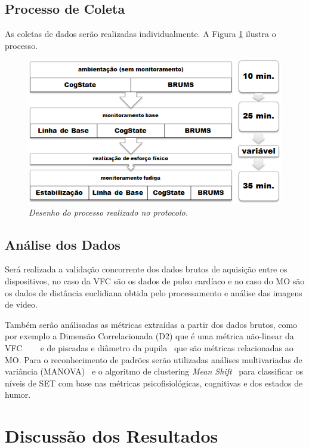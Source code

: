 \documentclass[10pt, conference, compsocconf]{IEEEtran}
\begin{document}
	 
\subsection{Processo de Coleta} 

	As coletas de dados serão realizadas individualmente. A Figura \ref{fig:processo} ilustra o processo.  
	
\begin{figure}[htb]
   \centering  
   \includegraphics[scale=.6]{img/fadiga_processo}
   \caption{\it Desenho do processo realizado no protocolo. }
   \label{fig:processo}
\end{figure}

\subsection{Análise dos Dados} 

	Será realizada a validação concorrente dos dados brutos de aquisição entre os dispositivos, no caso da VFC são os dados de pulso cardíaco e no caso do MO são os dados de distância euclidiana obtida pelo processamento e análise das imagens de video. 
	
	Também serão análisadas as métricas extraídas a partir dos dados brutos, como por exemplo a Dimensão Correlacionada (D2) que é uma métrica não-linear da VFC ~\cite{Standards1996a}~\cite{Schubert2009}~\cite{Niskanen2004} e de piscadas e diâmetro da pupila~\cite{McKinley2011} que são métricas relacionadas ao MO. Para o reconhecimento de padrões serão utilizadas análises multivariadas de variância (MANOVA)~\cite{Harris01} e o algoritmo de clustering \textit{Mean Shift}~\cite{Cheng95} para classificar os níveis de SET com base nas métricas psicofisiológicas, cognitivas e dos estados de humor.
	 

\section{Discussão dos Resultados}
	 
\end{document}
